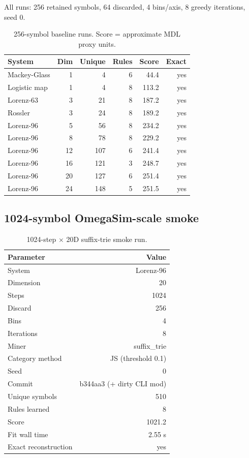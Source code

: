 \documentclass[11pt]{article}
\begin{document}
All runs: 256 retained symbols, 64 discarded, 4 bins/axis, 8 greedy iterations, seed 0.

\begin{table}[ht]
\centering
\small
\begin{tabular}{lrrrrr}
\toprule
System & Dim & Unique & Rules & Score & Exact \\
\midrule
Mackey-Glass & 1 & 4 & 6 & 44.4 & yes \\
Logistic map & 1 & 4 & 8 & 113.2 & yes \\
Lorenz-63 & 3 & 21 & 8 & 187.2 & yes \\
Rossler & 3 & 24 & 8 & 189.2 & yes \\
Lorenz-96 & 5 & 56 & 8 & 234.2 & yes \\
Lorenz-96 & 8 & 78 & 8 & 229.2 & yes \\
Lorenz-96 & 12 & 107 & 6 & 241.4 & yes \\
Lorenz-96 & 16 & 121 & 3 & 248.7 & yes \\
Lorenz-96 & 20 & 127 & 6 & 251.4 & yes \\
Lorenz-96 & 24 & 148 & 5 & 251.5 & yes \\
\bottomrule
\end{tabular}
\caption{256-symbol baseline runs. Score = approximate MDL proxy units.}
\end{table}

\subsection{1024-symbol OmegaSim-scale smoke}

\begin{table}[ht]
\centering
\begin{tabular}{lr}
\toprule
Parameter & Value \\
\midrule
System & Lorenz-96 \\
Dimension & 20 \\
Steps & 1024 \\
Discard & 256 \\
Bins & 4 \\
Iterations & 8 \\
Miner & suffix\_trie \\
Category method & JS (threshold 0.1) \\
Seed & 0 \\
Commit & b344aa3 (+ dirty CLI mod) \\
\midrule
Unique symbols & 510 \\
Rules learned & 8 \\
Score & 1021.2 \\
Fit wall time & 2.55 s \\
Exact reconstruction & yes \\
\bottomrule
\end{tabular}
\caption{1024-step $\times$ 20D suffix-trie smoke run.}
\end{table}
\end{document}
